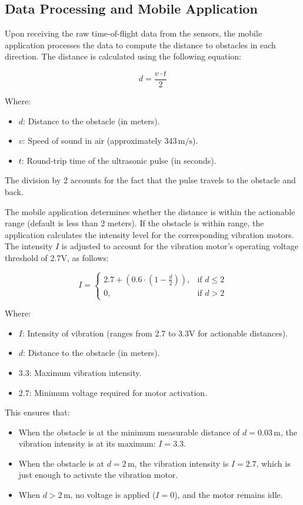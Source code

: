 \subsection{Data Processing and Mobile Application}

Upon receiving the raw time-of-flight data from the sensors, the mobile application processes the data to compute the distance to obstacles in each direction. The distance is calculated using the following equation:

\[
d = \frac{v \cdot t}{2}
\]

Where:
\begin{itemize}
	\item \(d\): Distance to the obstacle (in meters).
	\item \(v\): Speed of sound in air (approximately \(343 \, \text{m/s}\)).
	\item \(t\): Round-trip time of the ultrasonic pulse (in seconds).
\end{itemize}

The division by 2 accounts for the fact that the pulse travels to the obstacle and back.

The mobile application determines whether the distance is within the actionable range (default is less than 2 meters). If the obstacle is within range, the application calculates the intensity level for the corresponding vibration motors. The intensity \(I\) is adjusted to account for the vibration motor's operating voltage threshold of 2.7V, as follows:

\[
I = 
\begin{cases} 
	2.7 + (0.6 \cdot (1 - \frac{d}{2})), & \text{if } d \leq 2 \\ 
	0, & \text{if } d > 2
\end{cases}
\]

Where:
\begin{itemize}
	\item \(I\): Intensity of vibration (ranges from 2.7 to 3.3V for actionable distances).
	\item \(d\): Distance to the obstacle (in meters).
	\item \(3.3\): Maximum vibration intensity.
	\item \(2.7\): Minimum voltage required for motor activation.
\end{itemize}

This ensures that:
\begin{itemize}
	\item When the obstacle is at the minimum measurable distance of \(d = 0.03 \, \text{m}\), the vibration intensity is at its maximum: \(I = 3.3\).
	\item When the obstacle is at \(d = 2 \, \text{m}\), the vibration intensity is \(I = 2.7\), which is just enough to activate the vibration motor.
	\item When \(d > 2 \, \text{m}\), no voltage is applied (\(I = 0\)), and the motor remains idle.
\end{itemize}

